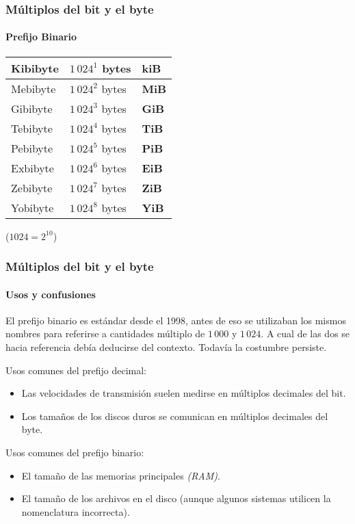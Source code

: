 \documentclass[11pt,a4paper,spanish]{beamer}
\begin{document}
\begin{frame}

\frametitle{Múltiplos del bit y el byte}

\framesubtitle{Prefijo Binario}

\centering
\begin{tabular}{l l l}
    Kibibyte & $1\,024^{1}$ bytes & \textbf{kiB}\\ \hline
    Mebibyte & $1\,024^{2}$ bytes & \textbf{MiB}\\ \hline
    Gibibyte & $1\,024^{3}$ bytes & \textbf{GiB}\\ \hline
    Tebibyte & $1\,024^{4}$ bytes & \textbf{TiB}\\ \hline
    Pebibyte & $1\,024^{5}$ bytes & \textbf{PiB}\\ \hline
    Exbibyte & $1\,024^{6}$ bytes & \textbf{EiB}\\ \hline
    Zebibyte & $1\,024^{7}$ bytes & \textbf{ZiB}\\ \hline
    Yobibyte & $1\,024^{8}$ bytes & \textbf{YiB}\\
\end{tabular}

\tiny ($1024 = 2^{10}$)
\end{frame}

\begin{frame}

\frametitle{Múltiplos del bit y el byte}

\framesubtitle{Usos y confusiones}

El prefijo binario es estándar desde el 1998, antes de eso se utilizaban los
    mismos nombres para referirse a cantidades múltiplo de $1\,000$ y
    $1\,024$. A cual de las dos se hacia referencia debía deducirse del
    contexto. Todavía la costumbre persiste.

\pause
Usos comunes del prefijo decimal:

\begin{itemize}
    \item Las velocidades de transmisión suelen medirse en múltiplos decimales del bit.
    \item Los tamaños de los discos duros se comunican en múltiplos decimales
        del byte.
\end{itemize}

\pause
Usos comunes del prefijo binario:

\begin{itemize}
    \item El tamaño de las memorias principales \emph{(RAM)}.
    \item El tamaño de los archivos en el disco (aunque algunos sistemas
        utilicen la nomenclatura incorrecta).
\end{itemize}

\end{frame}
\end{document}

